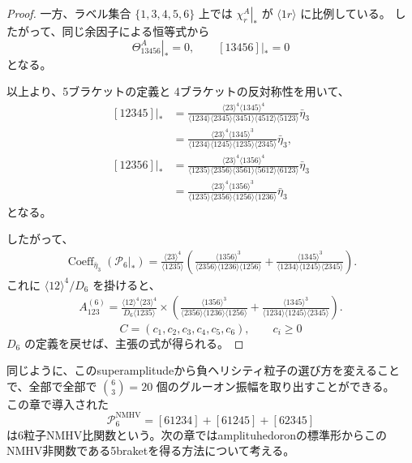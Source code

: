 \documentclass[uplatex,dvipdfmx,a4paper,11pt]{jsarticle}
\renewcommand{\proofname}{Proof}
\newenvironment{myproof}[1][\proofname]
  {\begin{proof}[#1]}
  {\end{proof}}
\numberwithin{equation}{section}
\begin{document}
\begin{myproof}
  一方、ラベル集合 $\{1,3,4,5,6\}$ 上では
  $\left.\chi_r^A\right|_*$ が
  $\langle1r\rangle$ に比例している。
  したがって、同じ余因子による恒等式から
  \[
    \left.\Theta_{13456}^A\right|_*=0,
    \qquad
    \left.[13456]\right|_*=0
  \]
  となる。

  以上より、5ブラケットの定義と
  4ブラケットの反対称性を用いて、
  \[
    \begin{aligned}
      \left.[12345]\right|_*
      &=
      \frac{
        \langle23\rangle^4\langle1345\rangle^4
      }{
        \langle1234\rangle\langle2345\rangle
        \langle3451\rangle\langle4512\rangle
        \langle5123\rangle
      }\bar\eta_3\\
      &=
      \frac{
        \langle23\rangle^4\langle1345\rangle^3
      }{
        \langle1234\rangle\langle1245\rangle
        \langle1235\rangle\langle2345\rangle
      }\bar\eta_3,
    \end{aligned}
  \]
  \[
    \begin{aligned}
      \left.[12356]\right|_*
      &=
      \frac{
        \langle23\rangle^4\langle1356\rangle^4
      }{
        \langle1235\rangle\langle2356\rangle
        \langle3561\rangle\langle5612\rangle
        \langle6123\rangle
      }\bar\eta_3\\
      &=
      \frac{
        \langle23\rangle^4\langle1356\rangle^3
      }{
        \langle1235\rangle\langle2356\rangle
        \langle1256\rangle\langle1236\rangle
      }\bar\eta_3
    \end{aligned}
  \]
  となる。

  したがって、
  \[
    \begin{aligned}
      \operatorname{Coeff}_{\bar\eta_3} 
        \left(\left.\mathcal P_6\right|_*\right)=
      \frac{\langle23\rangle^4}{\langle1235\rangle}
      \left(
        \frac{\langle1356\rangle^3}{
          \langle2356\rangle
          \langle1236\rangle
          \langle1256\rangle
        }
        +
        \frac{\langle1345\rangle^3}{
          \langle1234\rangle
          \langle1245\rangle
          \langle2345\rangle
        }
      \right).
    \end{aligned}
  \]
  これに $\langle12\rangle^4/D_6$ を掛けると、
  \[
    \begin{aligned}
      A_{123}^{(6)}
      =
      \frac{
        \langle12\rangle^4\langle23\rangle^4
      }{
        D_6\langle1235\rangle
      }
      \times
      \left(
        \frac{\langle1356\rangle^3}{
          \langle2356\rangle
          \langle1236\rangle
          \langle1256\rangle
        }
        +
        \frac{\langle1345\rangle^3}{
          \langle1234\rangle
          \langle1245\rangle
          \langle2345\rangle
        }
      \right).
    \end{aligned}
  \]\[
C=(c_1,c_2,c_3,c_4,c_5,c_6),
\qquad c_i\geq0
\]
  $D_6$ の定義を戻せば、主張の式が得られる。
\end{myproof}
同じように、このsuperamplitudeから負ヘリシティ粒子の選び方を変えることで、全部で全部で \(\binom63=20\) 個のグルーオン振幅を取り出すことができる。\\
この章で導入された
\[
\mathcal P_6^{\mathrm{NMHV}}
=
[61234]+[61245]+[62345]
\]
は6粒子NMHV比関数という。次の章ではamplituhedoronの標準形からこのNMHV非関数である5braketを得る方法について考える。
\end{document}
